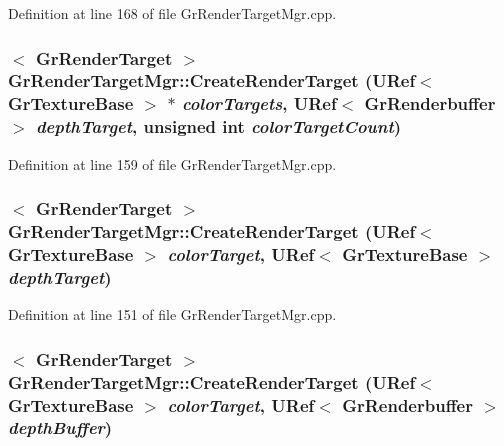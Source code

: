 \begin{CompactItemize}
Definition at line 168 of file GrRenderTargetMgr.cpp.\hypertarget{class_gr_render_target_mgr_cc419c722338e86241826a4f86ed9f96}{
\subsubsection[{CreateRenderTarget}]{$<$ {\bf GrRenderTarget} $>$ GrRenderTargetMgr::CreateRenderTarget ({\bf URef}$<$ {\bf GrTextureBase} $>$ $\ast$ {\em colorTargets}, \/  {\bf URef}$<$ {\bf GrRenderbuffer} $>$ {\em depthTarget}, \/  unsigned int {\em colorTargetCount})}}
\label{class_gr_render_target_mgr_cc419c722338e86241826a4f86ed9f96}




Definition at line 159 of file GrRenderTargetMgr.cpp.\hypertarget{class_gr_render_target_mgr_97ebd15d7e11c6b8cf151c96237425cd}{
\subsubsection[{CreateRenderTarget}]{$<$ {\bf GrRenderTarget} $>$ GrRenderTargetMgr::CreateRenderTarget ({\bf URef}$<$ {\bf GrTextureBase} $>$ {\em colorTarget}, \/  {\bf URef}$<$ {\bf GrTextureBase} $>$ {\em depthTarget})}}
\label{class_gr_render_target_mgr_97ebd15d7e11c6b8cf151c96237425cd}




Definition at line 151 of file GrRenderTargetMgr.cpp.\hypertarget{class_gr_render_target_mgr_f2943fd9b726ca96797aeb8f4cf534a7}{
\subsubsection[{CreateRenderTarget}]{$<$ {\bf GrRenderTarget} $>$ GrRenderTargetMgr::CreateRenderTarget ({\bf URef}$<$ {\bf GrTextureBase} $>$ {\em colorTarget}, \/  {\bf URef}$<$ {\bf GrRenderbuffer} $>$ {\em depthBuffer})}}
\label{class_gr_render_target_mgr_f2943fd9b726ca96797aeb8f4cf534a7}





\end{CompactItemize}
